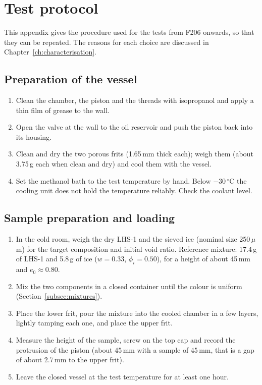 \chapter{Test protocol}
\label{app:protocol}%

This appendix gives the procedure used for the tests from F206 onwards, so that they can be repeated. The reasons for each choice are discussed in Chapter~\ref{ch:characterisation}.

\section{Preparation of the vessel}
\begin{enumerate}
    \item Clean the chamber, the piston and the threads with isopropanol and apply a thin film of grease to the wall.
    \item Open the valve at the wall to the oil reservoir and push the piston back into its housing.
    \item Clean and dry the two porous frits (1.65\,mm thick each); weigh them (about 3.75\,g each when clean and dry) and cool them with the vessel.
    \item Set the methanol bath to the test temperature by hand. Below $-30\,^\circ$C the cooling unit does not hold the temperature reliably. Check the coolant level.
\end{enumerate}

\section{Sample preparation and loading}
\begin{enumerate}
    \item In the cold room, weigh the dry LHS-1 and the sieved ice (nominal size 250\,$\mu$m) for the target composition and initial void ratio. Reference mixture: 17.4\,g of LHS-1 and 5.8\,g of ice ($w = 0.33$, $\phi_i = 0.50$), for a height of about 45\,mm and $e_0\approx0.80$.
    \item Mix the two components in a closed container until the colour is uniform (Section~\ref{subsec:mixtures}).
    \item Place the lower frit, pour the mixture into the cooled chamber in a few layers, lightly tamping each one, and place the upper frit.
    \item Measure the height of the sample, screw on the top cap and record the protrusion of the piston (about 45\,mm with a sample of 45\,mm, that is a gap of about 2.7\,mm to the upper frit).
    \item Leave the closed vessel at the test temperature for at least one hour.
\end{enumerate}

